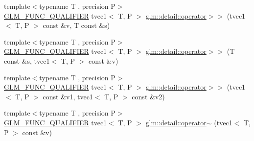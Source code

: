 \begin{DoxyCompactItemize}
\item 
{\footnotesize template$<$typename T , precision P$>$ }\\\hyperlink{setup_8hpp_a33fdea6f91c5f834105f7415e2a64407}{G\+L\+M\+\_\+\+F\+U\+N\+C\+\_\+\+Q\+U\+A\+L\+I\+F\+I\+ER} tvec1$<$ T, P $>$ \hyperlink{namespaceglm_1_1detail_a2aed600268ec8bf512b9b4ec04c3ac73}{glm\+::detail\+::operator$>$$>$} (tvec1$<$ T, P $>$ const \&v, T const \&s)
\item 
{\footnotesize template$<$typename T , precision P$>$ }\\\hyperlink{setup_8hpp_a33fdea6f91c5f834105f7415e2a64407}{G\+L\+M\+\_\+\+F\+U\+N\+C\+\_\+\+Q\+U\+A\+L\+I\+F\+I\+ER} tvec1$<$ T, P $>$ \hyperlink{namespaceglm_1_1detail_aba3bc24e84eb48beb0b892077e2e8cb1}{glm\+::detail\+::operator$>$$>$} (T const \&s, tvec1$<$ T, P $>$ const \&v)
\item 
{\footnotesize template$<$typename T , precision P$>$ }\\\hyperlink{setup_8hpp_a33fdea6f91c5f834105f7415e2a64407}{G\+L\+M\+\_\+\+F\+U\+N\+C\+\_\+\+Q\+U\+A\+L\+I\+F\+I\+ER} tvec1$<$ T, P $>$ \hyperlink{namespaceglm_1_1detail_a8dc12de1ecac67a31491a194f9720dc5}{glm\+::detail\+::operator$>$$>$} (tvec1$<$ T, P $>$ const \&v1, tvec1$<$ T, P $>$ const \&v2)
\item 
{\footnotesize template$<$typename T , precision P$>$ }\\\hyperlink{setup_8hpp_a33fdea6f91c5f834105f7415e2a64407}{G\+L\+M\+\_\+\+F\+U\+N\+C\+\_\+\+Q\+U\+A\+L\+I\+F\+I\+ER} tvec1$<$ T, P $>$ \hyperlink{namespaceglm_1_1detail_afd9a867f1bbb4cfde3973ebf3f5eb075}{glm\+::detail\+::operator$\sim$} (tvec1$<$ T, P $>$ const \&v)
\end{DoxyCompactItemize}
